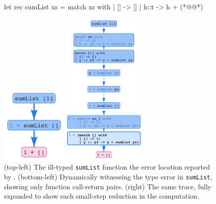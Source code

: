 \begin{figure}[t]
\centering
\begin{minipage}{.49\linewidth}
\centering
\begin{ecode}
let rec sumList xs =
  match xs with
  | []   -> []
  | h::t -> h + (*@@*)
\end{ecode}
\vspace{2em}
\includegraphics[height=1.5in]{nanomaly/sumList-overview.png}
\end{minipage}
\begin{minipage}{.49\linewidth}
\centering
\includegraphics[height=3in]{nanomaly/sumList-long.png}
\end{minipage}
\vspace{1em}
\caption[(top-left) The ill-typed \texttt{sumList} function
  highlighting the error location reported by
  \ocaml. (bottom-left) Dynamically witnessing the type error in
  \texttt{sumList}, showing only function call-return pairs. (right) The
  same trace, fully expanded to show each small-step reduction in the
  computation.]{(top-left) The ill-typed \texttt{sumList} function
   the error location reported by
  \ocaml. (bottom-left) Dynamically witnessing the type error in
  \texttt{sumList}, showing only function call-return pairs. (right) The
  same trace, fully expanded to show each small-step reduction in the
  computation.}
\label{fig:factorial}
\end{figure}

